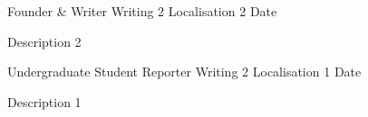\begin{cventries}
 \cventry
    {Founder \& Writer}
    {Writing 2}
    {Localisation 2}
    {Date}
    {
      \begin{cvitems}
        \item {Description 2}
      \end{cvitems}
    }

  \vspace{8 mm}
  
  \cventry
    {Undergraduate Student Reporter}
    {Writing 2}
    {Localisation 1}
    {Date}
    {
      \begin{cvitems}
        \item {Description 1}
\end{cvitems}
    }
\end{cventries}
